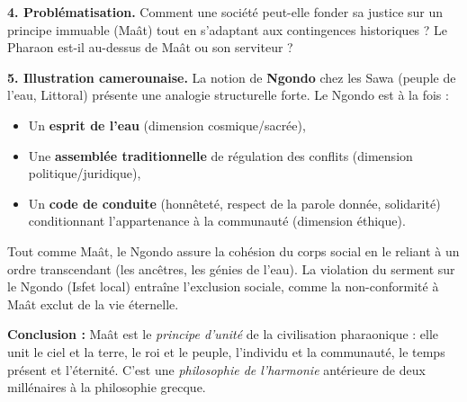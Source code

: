 \documentclass[11pt]{article}
\newcommand{\cle}[1]{{\popxbold\color{popdark}#1}}
\begin{document}
\begin{exoresolu}
\textbf{4. Problématisation.}
Comment une société peut-elle fonder sa justice sur un principe immuable (Maât) tout en s'adaptant aux contingences historiques ? Le Pharaon est-il au-dessus de Maât ou son serviteur ?

\textbf{5. Illustration camerounaise.}
La notion de \textbf{\cle{Ngondo}} chez les Sawa (peuple de l'eau, Littoral) présente une analogie structurelle forte. Le Ngondo est à la fois :
\begin{itemize}
    \item Un \textbf{esprit de l'eau} (dimension cosmique/sacrée),
    \item Une \textbf{assemblée traditionnelle} de régulation des conflits (dimension politique/juridique),
    \item Un \textbf{code de conduite} (honnêteté, respect de la parole donnée, solidarité) conditionnant l'appartenance à la communauté (dimension éthique).
\end{itemize}
Tout comme Maât, le Ngondo assure la cohésion du corps social en le reliant à un ordre transcendant (les ancêtres, les génies de l'eau). La violation du serment sur le Ngondo (Isfet local) entraîne l'exclusion sociale, comme la non-conformité à Maât exclut de la vie éternelle.

\textbf{Conclusion :} Maât est le \emph{principe d'unité} de la civilisation pharaonique : elle unit le ciel et la terre, le roi et le peuple, l'individu et la communauté, le temps présent et l'éternité. C'est une \emph{philosophie de l'harmonie} antérieure de deux millénaires à la philosophie grecque.
\end{exoresolu}
\end{document}
